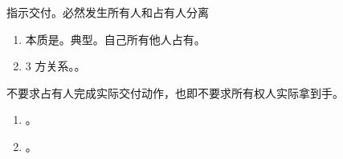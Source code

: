 \begin{enumerate}
\begin{enumerate}
\begin{enumerate}
                        \begin{kk}{指示交付。必然发生所有人和占有人分离}
                          \begin{enumerate}
                            \item 本质是。典型。自己所有他人占有。
                            \item 3 方关系。。
                          \end{enumerate}
                          \tcblower
                          不要求占有人完成实际交付动作，也即不要求所有权人实际拿到手。
                          \begin{enumerate}
                            \item {}。
                            \item {}。
                          \end{enumerate}
                        \end{kk}


\end{enumerate}
\end{enumerate}
\end{enumerate}
